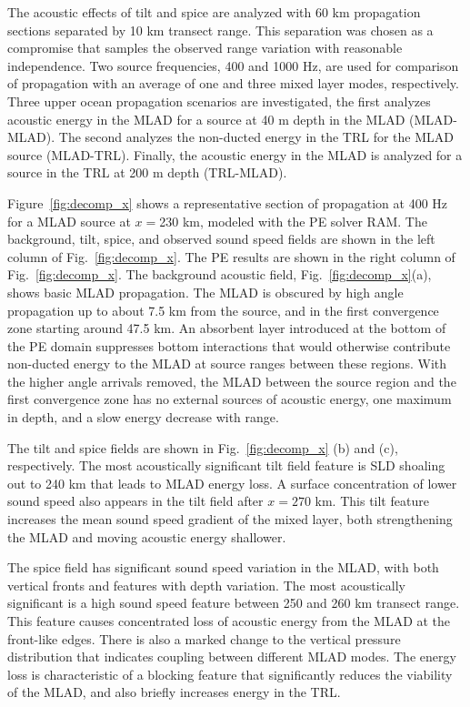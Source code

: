 \documentclass[preprint,NumberedRefs]{JASA}
\begin{document}
The acoustic effects of tilt and spice are analyzed with 60 km propagation sections separated by 10 km transect range. This separation was chosen as a compromise that samples the observed range variation with reasonable independence. Two source frequencies, 400 and 1000 Hz, are used for comparison of propagation with an average of one and three mixed layer modes, respectively. Three upper ocean propagation scenarios are investigated, the first analyzes acoustic energy in the MLAD for a source at 40 m depth in the MLAD (MLAD-MLAD). The second analyzes the non-ducted energy in the TRL for the MLAD source (MLAD-TRL). Finally, the acoustic energy in the MLAD is analyzed for a source in the TRL at 200 m depth (TRL-MLAD).

Figure~\ref{fig:decomp_x} shows a representative section of propagation at 400 Hz for a MLAD source at $x=$230 km, modeled with the PE solver RAM\citep{collins93}. The background, tilt, spice, and observed sound speed fields are shown in the left column of Fig.~\ref{fig:decomp_x}. The PE results are shown in the right column of Fig.~\ref{fig:decomp_x}. The background acoustic field, Fig.~\ref{fig:decomp_x}(a), shows basic MLAD propagation. The MLAD is obscured by high angle propagation up to about 7.5 km from the source, and in the first convergence zone starting around 47.5 km. An absorbent layer introduced at the bottom of the PE domain suppresses bottom interactions that would otherwise contribute non-ducted energy to the MLAD at source ranges between these regions. With the higher angle arrivals removed, the MLAD between the source region and the first convergence zone has no external sources of acoustic energy, one maximum in depth, and a slow energy decrease with range.

The tilt and spice fields are shown in Fig.~\ref{fig:decomp_x} (b) and (c), respectively. The most acoustically significant tilt field feature is SLD shoaling out to 240 km that leads to MLAD energy loss. A surface concentration of lower sound speed also appears in the tilt field after $x=270$ km. This tilt feature increases the mean sound speed gradient of the mixed layer, both strengthening the MLAD and moving acoustic energy shallower.

The spice field has significant sound speed variation in the MLAD, with both vertical fronts and features with depth variation. The most acoustically significant is a high sound speed feature between 250 and 260 km transect range. This feature causes concentrated loss of acoustic energy from the MLAD at the front-like edges. There is also a marked change to the vertical pressure distribution that indicates coupling between different MLAD modes. The energy loss is characteristic of a blocking feature that significantly reduces the viability of the MLAD, and also briefly increases energy in the TRL.
\end{document}
